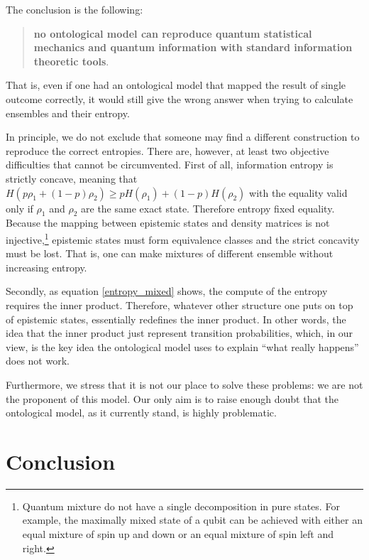 \documentclass[twocolumn,prl,floatfix,superscriptaddress]{revtex4-2}
\begin{document}
The conclusion is the following:
\begin{quote}
	\textbf{no ontological model can reproduce quantum statistical mechanics and quantum information with standard information theoretic tools}.
\end{quote}
That is, even if one had an ontological model that mapped the result of single outcome correctly, it would still give the wrong answer when trying to calculate ensembles and their entropy.

In principle, we do not exclude that someone may find a different construction to reproduce the correct entropies. There are, however, at least two objective difficulties that cannot be circumvented. First of all, information entropy is strictly concave, meaning that $H(p \rho_1 + (1-p) \rho_2) \geq p H(\rho_1) + (1-p) H(\rho_2)$ with the equality valid only if $\rho_1$ and $\rho_2$ are the same exact state. Therefore entropy fixed equality. Because the mapping between epistemic states and density matrices is not injective,\footnote{Quantum mixture do not have a single decomposition in pure states. For example, the maximally mixed state of a qubit can be achieved with either an equal mixture of spin up and down or an equal mixture of spin left and right.} epistemic states must form equivalence classes and the strict concavity must be lost. That is, one can make mixtures of different ensemble without increasing entropy.

Secondly, as equation \ref{entropy_mixed} shows, the compute of the entropy requires the inner product. Therefore, whatever other structure one puts on top of epistemic states, essentially redefines the inner product. In other words, the idea that the inner product just represent transition probabilities, which, in our view, is the key idea the ontological model uses to explain ``what really happens'' does not work.

Furthermore, we stress that it is not our place to solve these problems: we are not the proponent of this model. Our only aim is to raise enough doubt that the ontological model, as it currently stand, is highly problematic.

\section{Conclusion}
\end{document}
